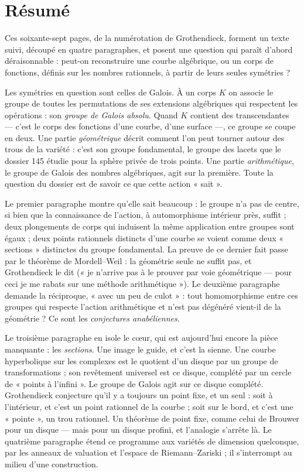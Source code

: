 \documentclass[11pt,a4paper]{article}
\begin{document}
\section*{Résumé}

\begin{resume}
Ces soixante-sept pages, de la numérotation de Grothendieck, forment un texte
suivi, découpé en quatre paragraphes, et posent une question qui paraît
d'abord déraisonnable : peut-on reconstruire une courbe algébrique, ou un
corps de fonctions, définis sur les nombres rationnels, à partir de leurs
seules symétries ?

Les symétries en question sont celles de Galois. À un corps $K$ on associe le
groupe de toutes les permutations de ses extensions algébriques qui respectent
les opérations : son \emph{groupe de Galois absolu}. Quand $K$ contient des
transcendantes — c'est le corps des fonctions d'une courbe, d'une surface —,
ce groupe se coupe en deux. Une partie \emph{géométrique} décrit comment l'on
peut tourner autour des trous de la variété : c'est son groupe fondamental, le
groupe des lacets que le dossier 145 étudie pour la sphère privée de trois
points. Une partie \emph{arithmétique}, le groupe de Galois des nombres
algébriques, agit sur la première. Toute la question du dossier est de savoir
ce que cette action « sait ».

Le premier paragraphe montre qu'elle sait beaucoup : le groupe n'a pas de
centre, si bien que la connaissance de l'action, à automorphisme intérieur
près, suffit ; deux plongements de corps qui induisent la même application
entre groupes sont égaux ; deux points rationnels distincts d'une courbe se
voient comme deux « sections » distinctes du groupe fondamental. La preuve de
ce dernier fait passe par le théorème de Mordell–Weil : la géométrie seule ne
suffit pas, et Grothendieck le dit (« je n'arrive pas à le prouver par voie
géométrique — pour ceci je me rabats sur une méthode arithmétique »). Le
deuxième paragraphe demande la réciproque, « avec un peu de culot » : tout
homomorphisme entre ces groupes qui respecte l'action arithmétique et n'est
pas dégénéré vient-il de la géométrie ? Ce sont les \emph{conjectures
anabéliennes}.

Le troisième paragraphe en isole le cœur, qui est aujourd'hui encore la
pièce manquante : les \emph{sections}. Une image le guide, et c'est la
sienne. Une courbe hyperbolique sur les complexes est le quotient d'un disque
par un groupe de transformations ; son revêtement universel est ce disque,
complété par un cercle de « points à l'infini ». Le groupe de Galois agit sur
ce disque complété. Grothendieck conjecture qu'il y a toujours un point fixe,
et un seul : soit à l'intérieur, et c'est un point rationnel de la courbe ;
soit sur le bord, et c'est une « pointe », un trou rationnel. Un théorème de
point fixe, comme celui de Brouwer pour un disque — mais pour un disque
profini, et l'analogie s'arrête là. Le quatrième paragraphe étend ce
programme aux variétés de dimension quelconque, par les anneaux de valuation
et l'espace de Riemann–Zariski ; il s'interrompt au milieu d'une construction.


\end{resume}
\end{document}
